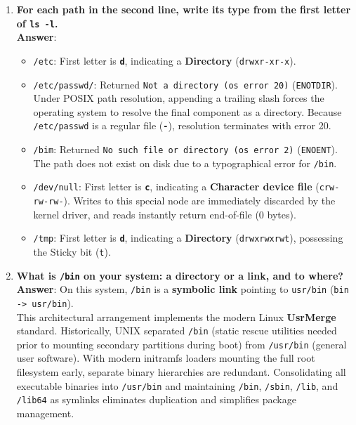 \documentclass[12pt,a4paper]{article}
\begin{document}
\begin{enumerate}
    \item \textbf{For each path in the second line, write its type from the first letter of \texttt{ls -l}.} \\
    \textbf{Answer}:
    \begin{itemize}
        \item \texttt{/etc}: First letter is \textbf{\texttt{d}}, indicating a \textbf{Directory} (\texttt{drwxr-xr-x}).
        \item \texttt{/etc/passwd/}: Returned \texttt{Not a directory (os error 20)} (\texttt{ENOTDIR}). Under POSIX path resolution, appending a trailing slash forces the operating system to resolve the final component as a directory. Because \texttt{/etc/passwd} is a regular file (\textbf{\texttt{-}}), resolution terminates with error 20.
        \item \texttt{/bim}: Returned \texttt{No such file or directory (os error 2)} (\texttt{ENOENT}). The path does not exist on disk due to a typographical error for \texttt{/bin}.
        \item \texttt{/dev/null}: First letter is \textbf{\texttt{c}}, indicating a \textbf{Character device file} (\texttt{crw-rw-rw-}). Writes to this special node are immediately discarded by the kernel driver, and reads instantly return end-of-file (0 bytes).
        \item \texttt{/tmp}: First letter is \textbf{\texttt{d}}, indicating a \textbf{Directory} (\texttt{drwxrwxrwt}), possessing the Sticky bit (\texttt{t}).
    \end{itemize}

    \item \textbf{What is \texttt{/bin} on your system: a directory or a link, and to where?} \\
    \textbf{Answer}: On this system, \texttt{/bin} is a \textbf{symbolic link} pointing to \texttt{usr/bin} (\texttt{bin -> usr/bin}). \\
    This architectural arrangement implements the modern Linux \textbf{UsrMerge} standard. Historically, UNIX separated \texttt{/bin} (static rescue utilities needed prior to mounting secondary partitions during boot) from \texttt{/usr/bin} (general user software). With modern initramfs loaders mounting the full root filesystem early, separate binary hierarchies are redundant. Consolidating all executable binaries into \texttt{/usr/bin} and maintaining \texttt{/bin}, \texttt{/sbin}, \texttt{/lib}, and \texttt{/lib64} as symlinks eliminates duplication and simplifies package management.


\end{enumerate}
\end{document}
